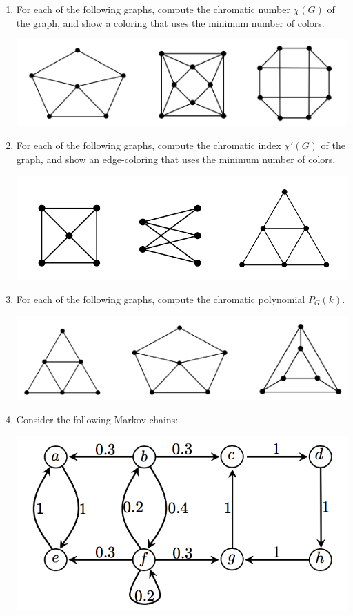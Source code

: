 \documentclass{article}
\begin{document}
\begin{enumerate}
	\item For each of the following graphs, compute the chromatic number $\chi(G)$ of the graph, and show a coloring that uses the minimum number of colors.
	\begin{center}
	\includegraphics[width=.6\textwidth]{pic1.png}
	\end{center}

	\item For each of the following graphs, compute the chromatic index $\chi'(G)$ of the graph, and show an edge-coloring that uses the minimum number of colors.
	\begin{center}
	\includegraphics[width=.6\textwidth]{pic2.png}
	\end{center}

	\item For each of the following graphs, compute the chromatic polynomial $P_G(k)$.
	\begin{center}
	\includegraphics[width=.6\textwidth]{pic3.png}
	\end{center}	

\pagebreak

	\item Consider the following Markov chains:
	\begin{center}
	\includegraphics[width=.5\textwidth]{pic4.png}
	\end{center}


\end{enumerate}
\end{document}
